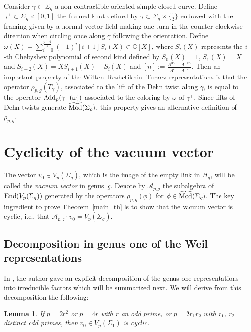 \documentclass[pdftex]{sigma}
\numberwithin{equation}{section}
\newtheorem{Lemma}[Theorem]{Lemma}
\begin{document}
Consider $\gamma\subset \Sigma_g$ a non-contractible oriented simple closed curve. Define $\gamma^+\subset \Sigma_g\times [0,1]$ the framed knot defined by $\gamma\subset \Sigma_g\times \big\{ \frac{1}{2} \big\}$ endowed with the framing given by a normal vector field making one turn in the counter-clockwise direction when circling once along $\gamma$ following the orientation. Define $\omega(X)=\sum\limits_{i=0}^ {\frac{p-4}{2}} (-1)^i [i+1]S_i(X) \in \mathbb{C}[X]$, where $S_i(X)$ represents the $i$-{th} Chebyshev polynomial of second kind defined by $S_0(X)=1$, $S_1(X)=X$ and $S_{i+2}(X)=XS_{i+1}(X)-S_i(X) $ and $[n]:= \frac{A^{2n}-A^{-2n}}{A^2 - A^{-2}}$. Then an important property of the Witten--Reshetikhin--Turaev representations is that the operator $\rho_{p,g}(T_{\gamma})$, associated to the lift of the Dehn twist along $\gamma$, is equal to the operator $\operatorname{Add}_p(\gamma^+(\omega))$ associated to the coloring by $\omega$ of $\gamma^+$. Since lifts of Dehn twists generate $\widetilde{\operatorname{Mod}}(\Sigma_g)$, this property gives an alternative definition of $\rho_{p,g}$.

\section{Cyclicity of the vacuum vector}

The vector $v_0\in V_p(\Sigma_g)$, which is the image of the empty link in $H_g$, will be called the \textit{vacuum vector} in genus~$g$. Denote by $\mathcal{A}_{p,g}$ the subalgebra of $\operatorname{End}(V_p(\Sigma_g))$ generated by the operators $\rho_{p,g}(\phi)$ for $\phi \in \widetilde{\operatorname{Mod}}(\Sigma_g)$. The key ingredient to prove Theorem~\ref{main_th} is to show that the vacuum vector is cyclic, i.e., that $\mathcal{A}_{p,g}\cdot v_0 =V_p(\Sigma_g)$.

\subsection{Decomposition in genus one of the Weil representations}
In \cite[Corollary 1.2]{Koju1}, the author gave an explicit decomposition of the genus one representations into irreducible factors which will be summarized next. We will derive from this decomposition the following:
\begin{Lemma}\label{lemma_genusone1} If $p=2r^2$ or $p=4r$ with $r$ an odd prime, or $p=2r_1r_2$ with $r_1$, $r_2$ distinct odd primes, then $v_0 \in V_p(\Sigma_1)$ is cyclic.
\end{Lemma}
\end{document}

